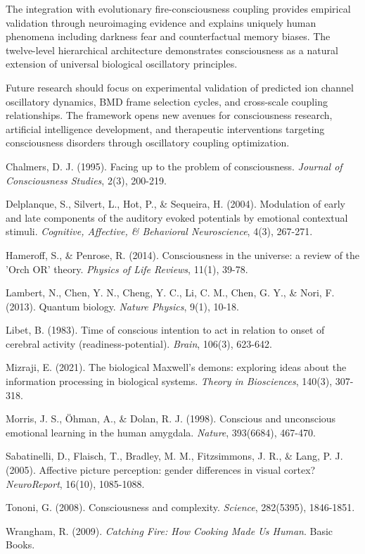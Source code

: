 \documentclass[12pt,a4paper]{article}
\begin{document}
The integration with evolutionary fire-consciousness coupling provides empirical validation through neuroimaging evidence and explains uniquely human phenomena including darkness fear and counterfactual memory biases. The twelve-level hierarchical architecture demonstrates consciousness as a natural extension of universal biological oscillatory principles.

Future research should focus on experimental validation of predicted ion channel oscillatory dynamics, BMD frame selection cycles, and cross-scale coupling relationships. The framework opens new avenues for consciousness research, artificial intelligence development, and therapeutic interventions targeting consciousness disorders through oscillatory coupling optimization.




\begin{thebibliography}{99}

Chalmers, D. J. (1995). Facing up to the problem of consciousness. \textit{Journal of Consciousness Studies}, 2(3), 200-219.

Delplanque, S., Silvert, L., Hot, P., \& Sequeira, H. (2004). Modulation of early and late components of the auditory evoked potentials by emotional contextual stimuli. \textit{Cognitive, Affective, \& Behavioral Neuroscience}, 4(3), 267-271.

Hameroff, S., \& Penrose, R. (2014). Consciousness in the universe: a review of the 'Orch OR' theory. \textit{Physics of Life Reviews}, 11(1), 39-78.

Lambert, N., Chen, Y. N., Cheng, Y. C., Li, C. M., Chen, G. Y., \& Nori, F. (2013). Quantum biology. \textit{Nature Physics}, 9(1), 10-18.

Libet, B. (1983). Time of conscious intention to act in relation to onset of cerebral activity (readiness-potential). \textit{Brain}, 106(3), 623-642.

Mizraji, E. (2021). The biological Maxwell's demons: exploring ideas about the information processing in biological systems. \textit{Theory in Biosciences}, 140(3), 307-318.

Morris, J. S., Öhman, A., \& Dolan, R. J. (1998). Conscious and unconscious emotional learning in the human amygdala. \textit{Nature}, 393(6684), 467-470.

Sabatinelli, D., Flaisch, T., Bradley, M. M., Fitzsimmons, J. R., \& Lang, P. J. (2005). Affective picture perception: gender differences in visual cortex? \textit{NeuroReport}, 16(10), 1085-1088.

Tononi, G. (2008). Consciousness and complexity. \textit{Science}, 282(5395), 1846-1851.

Wrangham, R. (2009). \textit{Catching Fire: How Cooking Made Us Human}. Basic Books.

\end{thebibliography}
\end{document}
